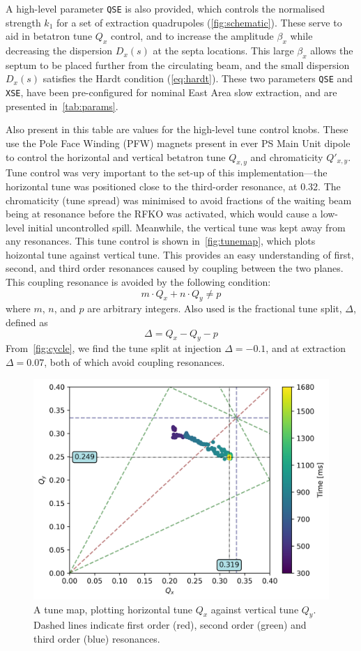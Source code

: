 \documentclass[11pt]{report}
\begin{document}
A high-level parameter \verb|QSE| is also provided, which controls the normalised strength $k_1$ for a set of extraction quadrupoles (\autoref{fig:schematic}). These serve to aid in betatron tune $Q_x$ control, and to increase the amplitude $\beta_x$ while decreasing the dispersion $D_x(s)$ at the septa locations. This large $\beta_x$ allows the septum to be placed further from the circulating beam, and the small dispersion $D_x(s)$ satisfies the Hardt condition (\autoref{eq:hardt}). These two parameters \verb|QSE| and \verb|XSE|, have been pre-configured for nominal East Area slow extraction, and are presented in~\autoref{tab:params}. 

Also present in this table are values for the high-level tune control knobs. These use the Pole Face Winding (PFW) magnets present in ever PS Main Unit dipole to control the horizontal and vertical betatron tune $Q_{x, y}$ and chromaticity $Q'_{x, y}$. Tune control was very important to the set-up of this implementation---the horizontal tune was positioned close to the third-order resonance, at 0.32. The chromaticity (tune spread) was minimised to avoid fractions of the waiting beam being at resonance before the RFKO was activated, which would cause a low-level initial uncontrolled spill. Meanwhile, the vertical tune was kept away from any resonances. This tune control is shown in~\autoref{fig:tunemap}, which plots hoizontal tune against vertical tune. This provides an easy understanding of first, second, and third order resonances caused by coupling between the two planes. This coupling resonance is avoided by the following condition:
\begin{equation}
  m\cdot Q_x+n\cdot Q_y\neq p
\end{equation} where $m$, $n$, and $p$ are arbitrary integers. Also used is the fractional tune split, $\Delta$, defined as
\begin{equation}
  \Delta = Q_x-Q_y-p
\end{equation}
From~\autoref{fig:cycle}, we find the tune split at injection $\Delta=-0.1$, and at extraction $\Delta=0.07$, both of which avoid coupling resonances.

\begin{figure}
  \centering
  \includegraphics[width=0.6\linewidth]{tunemap.png}
  \caption{A tune map, plotting horizontal tune $Q_x$ against vertical tune $Q_y$. Dashed lines indicate first order (red), second order (green) and third order (blue) resonances.}\label{fig:tunemap}
\end{figure}
\end{document}
